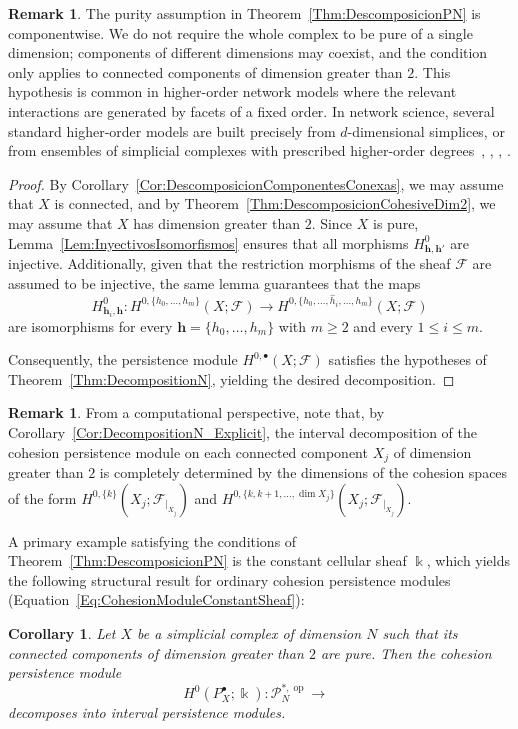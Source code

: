 \documentclass[reqno,12pt]{amsart}
\newcommand{\cF}{{\mathcal F}}
\newcommand{\cP}{\mathcal{P}}
\DeclareMathOperator{\vect}{\mathbf{vect}_\Bbbk}
\DeclareMathOperator{\op}{op}
\newcommand{\0}{\mathbf 0}
\newcommand{\h}{\mathbf{h}}
\newtheorem{corollary}[theorem]{Corollary}
\theoremstyle{definition}
\newtheorem{remark}[theorem]{Remark}
\begin{document}
\begin{remark}
The purity assumption in Theorem~\ref{Thm:DescomposicionPN} is componentwise. We do not require the whole complex to be pure of a single dimension; components of different dimensions may coexist, and the condition only applies to connected components of dimension greater than $2$. This hypothesis is common in higher-order network models where the relevant interactions are generated by facets of a fixed order. In network science, several standard higher-order models are built precisely from $d$-dimensional simplices, or from ensembles of simplicial complexes with prescribed higher-order degrees~\cite{Bianconi_Rahmede16}, \cite{Bianconi_Rahmede17}, \cite{Courtney_Bianconi16}, \cite{Courtney_Bianconi17}. 
\end{remark}

\begin{proof}
    By Corollary~\ref{Cor:DescomposicionComponentesConexas}, we may assume that $X$ is connected, and by Theorem~\ref{Thm:DescomposicionCohesiveDim2}, we may assume that $X$ has dimension greater than $2$. Since $X$ is pure, Lemma~\ref{Lem:InyectivosIsomorfismos} ensures that all morphisms $H^0_{\h,\h'}$ are injective. Additionally, given that the restriction morphisms of the sheaf $\cF$ are assumed to be injective, the same lemma guarantees that the maps
    \begin{equation}\label{Eq:Isomorfismos2}
        H^0_{\h_i,\h}\colon H^{0,\{h_0,\dots,h_m\}}(X;\cF)\longrightarrow H^{0,\{h_0,\dots,\widehat{h}_i,\dots,h_m\}}(X;\cF)
    \end{equation}
    are isomorphisms for every $\h=\{h_0,\dots,h_m\}$ with $m\geq 2$ and every $1\leq i\leq m$. 
    
    Consequently, the persistence module $H^{0,\bullet}(X;\cF)$ satisfies the hypotheses of Theorem~\ref{Thm:DecompositionN}, yielding the desired decomposition.
\end{proof}


\begin{remark}
From a computational perspective, note that, by Corollary~\ref{Cor:DecompositionN_Explicit}, the interval decomposition of the cohesion persistence module on each connected component $X_j$ of dimension greater than $2$ is completely determined by the dimensions of the cohesion spaces of the form $H^{0,\{k\}}(X_j;\cF_{|_{X_j}})$ and $H^{0,\{k,k+1,\dots,\dim X_j\}}(X_j;\cF_{|_{X_j}})$.
\end{remark}

A primary example satisfying the conditions of Theorem~\ref{Thm:DescomposicionPN} is the constant cellular sheaf $\Bbbk$, which yields the following structural result for ordinary cohesion persistence modules (Equation~\eqref{Eq:CohesionModuleConstantSheaf}):
\begin{corollary}
Let $X$ be a simplicial complex of dimension $N$ such that its connected components of dimension greater than $2$ are pure. Then the cohesion persistence module
\[
H^{0}(P_X^\bullet;\Bbbk)\colon \cP_N^{*,\op} \longrightarrow \vect
\]
decomposes into interval persistence modules.
\end{corollary}
\end{document}
